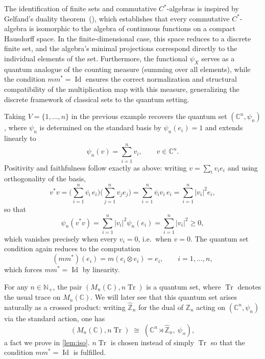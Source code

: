 \begin{remark}
    \label{rem:gelfand-duality}
    The identification of finite sets and commutative \(C^{*}\)-algebras is
    inspired by Gelfand's duality theorem~(\textcite{negrepontis71}),
    which establishes that
    every commutative \(C^{*}\)-algebra is isomorphic to the algebra of
    continuous functions on a compact Hausdorff space. In the
    finite-dimensional case, this space reduces to a discrete finite
    set, and the algebra's minimal projections correspond directly to
    the individual elements of the set. Furthermore, the functional \( \psi_X \)
    serves as a quantum analogue of the counting measure (summing
    over all elements), while the condition \( mm^{*} =
    \operatorname{Id} \) ensures the correct normalization and
    structural compatibility of the multiplication map with this
    measure, generalizing the discrete framework of
    classical sets to the quantum setting.
\end{remark}

\begin{example}
    \label{example:cn}
    Taking \( V = \{1, \dots, n\} \) in the previous example recovers the
    quantum set \( (\mathbb{C}^n, \psi_n) \), where \( \psi_n \) is
    determined on the standard basis by \( \psi_n(e_i) = 1 \) and extends
    linearly to
    \[
        \psi_n(v) = \sum_{i=1}^n v_i, \qquad v \in \mathbb{C}^n.
    \]
    Positivity and faithfulness follow exactly as above: writing
    \( v = \sum_i v_i e_i \) and using orthogonality of the basis,
    \[
        v^*v = \Big(\sum_{i=1}^n \overline{v_i}\,
        e_i\Big)\Big(\sum_{j=1}^n v_j e_j\Big)
        = \sum_{i=1}^n \overline{v_i}v_i\, e_i = \sum_{i=1}^n |v_i|^2 e_i,
    \]
    so that
    \[
        \psi_n(v^*v) = \sum_{i=1}^n |v_i|^2 \psi_n(e_i) =
        \sum_{i=1}^n |v_i|^2 \geq 0,
    \]
    which vanishes precisely when every \( v_i = 0 \), i.e.\ when
    \( v = 0 \). The quantum set condition again reduces to the
    computation
    \[
        (mm^*)(e_i) = m(e_i \otimes e_i) = e_i, \qquad i = 1,\dots,n,
    \]
    which forces \( mm^* = \operatorname{Id} \) by linearity.
\end{example}

\begin{example}
    \label{example:matrix-algebras-quantum-set}
    For any \( n \in \mathbb{N}_+ \), the pair
    \( (M_n (\mathbb{C}), n\operatorname{Tr}) \) is a quantum set, where
    \( \operatorname{Tr} \) denotes the usual trace on \( M_n
    (\mathbb{C}) \). We will
    later see that this quantum set arises naturally as a crossed
    product: writing \( \widehat{\mathbb{Z}}_n \) for the dual of
    \( \mathbb{Z}_n \) acting on \( (\mathbb{C}^n, \psi_n) \) via the
    standard action, one has
    \[
        (M_n (\mathbb{C}), n\operatorname{Tr}) \;\cong\;
        (\mathbb{C}^n \rtimes \widehat{\mathbb{Z}}_n,\ \psi_\rtimes),
    \]
    a fact we prove in \ref{lem:iso}.
    \( n \operatorname{Tr} \) is chosen instead of simply \(
    \operatorname{Tr} \) so that the condition \( mm^{*} =
    \operatorname{Id} \) is fulfilled.
\end{example}

